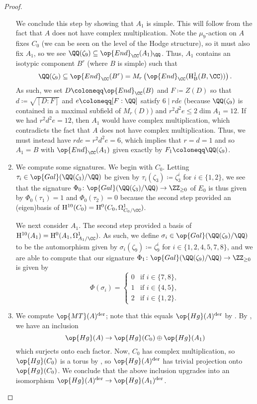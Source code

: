 \documentclass[../thesis.tex]{subfiles}
\begin{document}
\begin{proof}
\begin{enumerate}
		We conclude this step by showing that $A_1$ is simple. This will follow from the fact that $A$ does not have complex multiplication. Note the $\mu_9$-action on $A$ fixes $C_0$ (we can be seen on the level of the Hodge structure), so it must also fix $A_1$, so we see $\QQ(\zeta_9)\subseteq\op{End}_\CC(A_1)_\QQ$. Thus, $A_1$ contains an isotypic component $B^r$ (where $B$ is simple) such that
		\[\QQ(\zeta_9)\subseteq\op{End}_\CC(B^r)=M_r\left(\op{End}_\CC(\mathrm H^1_{\mathrm B}(B,\CC))\right).\]
		As such, we set $D\coloneqq\op{End}_\CC(B)$ and $F\coloneqq Z(D)$ so that $d\coloneqq\sqrt{[D:F]}$ and $e\coloneqq[F:\QQ]$ satisfy $6\mid rde$ (because $\QQ(\zeta_9)$ is contained in a maximal subfield of $M_r(D)$) and $r^2d^2e\le2\dim A_1=12$. If we had $r^2d^2e=12$, then $A_1$ would have complex multiplication, which contradicts the fact that $A$ does not have complex multiplication. Thus, we must instead have $rde=r^2d^2e=6$, which implies that $r=d=1$ and so $A_1=B$ with $\op{End}_\CC(A_1)$ given exactly by $F_1\coloneqq\QQ(\zeta_9)$.

		\item We compute some signatures. We begin with $C_0$. Letting $\tau_i\in\op{Gal}(\QQ(\zeta_3)/\QQ)$ be given by $\tau_i(\zeta_3)\coloneqq\zeta_3^i$ for $i\in\{1,2\}$, we see that the signature $\Phi_0\colon\op{Gal}(\QQ(\zeta_3)/\QQ)\to\ZZ_{\ge0}$ of $E_0$ is thus given by $\Phi_0(\tau_1)=1$ and $\Phi_0(\tau_2)=0$ because the second step provided an (eigen)basis of $\mathrm H^{10}(C_0)=\mathrm H^0(C_0,\Omega^1_{C_0/\CC})$.

		We next consider $A_1$. The second step provided a basis of $\mathrm H^{10}(A_1)=\mathrm H^0(A_1,\Omega^1_{A_1/\CC})$. As such, we define $\sigma_i\in\op{Gal}(\QQ(\zeta_9)/\QQ)$ to be the automorphism given by $\sigma_i(\zeta_9)\coloneqq\zeta_9^i$ for $i\in\{1,2,4,5,7,8\}$, and we are able to compute that our signature $\Phi_1\colon\op{Gal}(\QQ(\zeta_9)/\QQ)\to\ZZ_{\ge0}$ is given by
		\[\Phi(\sigma_i)=\begin{cases}
			0 & \text{if }i\in\{7,8\}, \\
			1 & \text{if }i\in\{4,5\}, \\
			2 & \text{if }i\in\{1,2\}.
		\end{cases}\]

		\item We compute $\op{MT}(A)^{\mathrm{der}}$; note that this equals $\op{Hg}(A)^{\mathrm{der}}$ by . By , we have an inclusion
		\[\op{Hg}(A)\to\op{Hg}(C_0)\oplus\op{Hg}(A_1)\]
		which surjects onto each factor. Now, $C_0$ has complex multiplication, so $\op{Hg}(C_0)$ is a torus by , so $\op{Hg}(A)^{\mathrm{der}}$ has trivial projection onto $\op{Hg}(C_0)$. We conclude that the above inclusion upgrades into an isomorphism $\op{Hg}(A)^{\mathrm{der}}\to\op{Hg}(A_1)^{\mathrm{der}}$.
		

\end{enumerate}
\end{proof}
\end{document}
